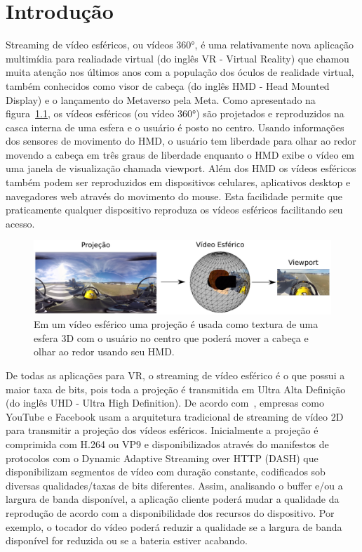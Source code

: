 \chapter{Introdução}\label{Cap:Introduction}


Streaming de vídeo esféricos, ou vídeos 360°, é uma relativamente nova aplicação multimídia para realiadade virtual (do inglês VR - Virtual Reality) que chamou muita atenção nos últimos anos com a população dos óculos de realidade virtual, também conhecidos como visor de cabeça (do inglês HMD - Head Mounted Display) e o lançamento do Metaverso pela Meta. Como apresentado na figura~\ref{fig:video360}, os vídeos esféricos (ou vídeo 360°) são projetados e reproduzidos na casca interna de uma esfera e o usuário é posto no centro. Usando informações dos sensores de movimento do HMD, o usuário tem liberdade para olhar ao redor movendo a cabeça em três graus de liberdade enquanto o HMD exibe o vídeo em uma janela de visualização chamada viewport. Além dos HMD os vídeos esféricos também podem ser reproduzidos em dispositivos celulares, aplicativos desktop e navegadores web através do movimento do mouse. Esta facilidade permite que praticamente qualquer dispositivo reproduza os vídeos esféricos facilitando seu acesso.

\begin{figure}[htb]
	\centering
	\includegraphics[width=0.8\columnwidth]{fig/viewport.pdf}
	\caption{Em um vídeo esférico uma projeção é usada como textura de uma esfera 3D com o usuário no centro que poderá mover a cabeça e olhar ao redor usando seu HMD.}
	\label{fig:video360}
\end{figure}

De todas as aplicações para VR, o streaming de vídeo esférico é o que possui a maior taxa de bits, pois toda a projeção é transmitida em Ultra Alta Definição (do inglês UHD - Ultra High Definition). De acordo com~\cite{Zhou2017, Liu2017}, empresas como YouTube e Facebook usam a arquitetura tradicional de streaming de vídeo 2D para transmitir a projeção dos vídeos esféricos. Inicialmente a projeção é comprimida com H.264 ou VP9 e disponibilizados através do manifestos de protocolos com o Dynamic Adaptive Streaming over HTTP (DASH) que disponibilizam segmentos de vídeo com duração constante, codificados sob diversas qualidades/taxas de bits diferentes. Assim, analisando o buffer e/ou a largura de banda disponível, a aplicação cliente poderá mudar a qualidade da reprodução de acordo com a disponibilidade dos recursos do dispositivo. Por exemplo, o tocador do vídeo poderá reduzir a qualidade se a largura de banda disponível for reduzida ou se a bateria estiver acabando.

